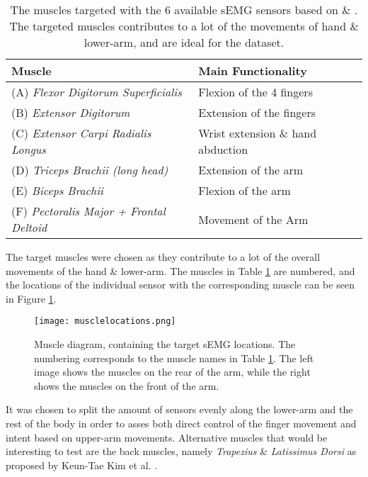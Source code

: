 \documentclass[../main.tex]{subfiles}
\begin{document}
\begin{table}[H]
\begin{center}
\begin{tabular}{ |l|l| } 
\hline
Muscle & Main Functionality \\ 
\hline
(A) \textit{Flexor Digitorum Superficialis} & Flexion of the 4 fingers \\
(B) \textit{Extensor Digitorum} & Extension of the fingers \\
(C) \textit{Extensor Carpi Radialis Longus} & Wrist extension \& hand abduction \\
(D) \textit{Triceps Brachii (long head)} & Extension of the arm \\
(E) \textit{Biceps Brachii} & Flexion of the arm \\
(F) \textit{Pectoralis Major + Frontal Deltoid} & Movement of the Arm \\
\hline
\end{tabular}
\caption{The muscles targeted with the 6 available sEMG sensors based on \cite{Batzianoulis2018} \& \cite{jarque2019}.
 The targeted muscles contributes to a lot of the movements of hand \& lower-arm, and are ideal for the dataset.
}
\label{tab:muscletargets}
\end{center}
\end{table}

The target muscles were chosen as they contribute to a lot of the overall movements of the hand \& lower-arm.
The muscles in Table \ref{tab:muscletargets} are numbered, and the locations of the individual sensor with the corresponding muscle can be seen in Figure \ref{fig:musclesensordiagram}.

\begin{figure}[H]
\begin{center}
\texttt{[image: musclelocations.png]}
\caption{Muscle diagram, containing the target sEMG locations. The numbering corresponds to the muscle names in Table \ref{tab:muscletargets}. The left image shows the muscles on the rear of the arm, while the right shows the muscles on the front of the arm.}
\label{fig:musclesensordiagram}
\end{center}
\end{figure}

It was chosen to split the amount of sensors evenly along the lower-arm and the rest of the body in order to asses both direct control of the finger movement and intent based on upper-arm movements.
Alternative muscles that would be interesting to test are the back muscles, namely \textit{Trapezius} \& \textit{Latissimus Dorsi} as proposed by Keun-Tae Kim et al. \cite{KeunTaeKim2021}.
\end{document}
